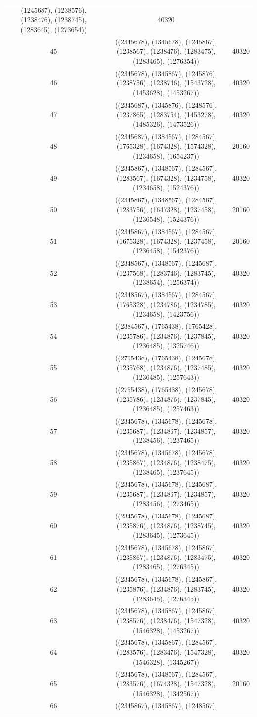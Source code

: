 \documentclass[pdftex]{sigma}
\theoremstyle{definition}
\numberwithin{equation}{section}
\begin{document}
\begin{center}
\begin{longtable}{|@{\,}c@{\,}|@{\,}c@{\,}|@{\,}c@{\,}|}
(1245687), (1238576), (1238476), (1238745), (1283645), (1273654)) & 40320 \\ 45 & ((2345678), (1345678), (1245867), (1238567), (1238476), (1283475), (1283465), (1276354)) & 40320 \\ 46 & ((2345678), (1345867), (1245876), (1238756), (1238746), (1543728), (1453628), (1453267)) & 40320 \\ 47 & ((2345687), (1345876), (1248576), (1237865), (1283764), (1453278), (1485326), (1473526)) & 40320 \\ 48 & ((2345687), (1384567), (1284567), (1765328), (1674328), (1574328), (1234658), (1654237)) & 20160 \\ 49 & ((2345867), (1348567), (1284567), (1283567), (1674328), (1234758), (1234658), (1524376)) & 40320 \\ 50 & ((2345867), (1348567), (1284567), (1283756), (1647328), (1237458), (1236548), (1524376)) & 20160 \\ 51 & ((2345867), (1384567), (1284567), (1675328), (1674328), (1237458), (1236458), (1542376)) & 20160 \\ 52 & ((2348567), (1348567), (1245687), (1237568), (1283746), (1283745), (1238654), (1256374)) & 40320 \\ 53 & ((2348567), (1384567), (1284567), (1765328), (1234786), (1234785), (1234658), (1423756)) & 40320 \\ 54 & ((2384567), (1765438), (1765428), (1235786), (1234876), (1237845), (1236485), (1325746)) & 40320 \\ 55 & ((2765438), (1765438), (1245678), (1235768), (1234876), (1237485), (1236485), (1257643)) & 40320 \\ 56 & ((2765438), (1765438), (1245678), (1235786), (1234876), (1237845), (1236485), (1257463)) & 40320 \\ 57 & ((2345678), (1345678), (1245678), (1235687), (1234867), (1234857), (1238456), (1237465)) & 40320 \\ 58 & ((2345678), (1345678), (1245678), (1235867), (1234876), (1238475), (1238465), (1237645)) & 40320 \\ 59 & ((2345678), (1345678), (1245687), (1235687), (1234867), (1234857), (1283456), (1273465)) & 40320 \\ 60 & ((2345678), (1345678), (1245687), (1235876), (1234876), (1238745), (1283645), (1273645)) & 40320 \\ 61 & ((2345678), (1345678), (1245867), (1235867), (1234876), (1283475), (1283465), (1276345)) & 40320 \\ 62 & ((2345678), (1345678), (1245867), (1235876), (1234876), (1283745), (1283645), (1276345)) & 40320 \\ 63 & ((2345678), (1345867), (1245867), (1238576), (1238476), (1547328), (1546328), (1453267)) & 40320 \\ 64 & ((2345678), (1345867), (1284567), (1283576), (1283476), (1547328), (1546328), (1345267)) & 40320 \\ 65 & ((2345678), (1348567), (1284567), (1283576), (1674328), (1547328), (1546328), (1342567)) & 20160 \\ 66 & ((2345867), (1345867), (1248567), 
\end{longtable}
\end{center}
\end{document}
